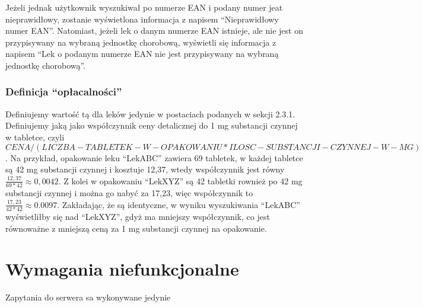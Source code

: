 \documentclass{article}
\begin{document}
      Jeżeli jednak użytkownik wyszukiwał po numerze EAN i podany numer jeat nieprawidłowy, zostanie wyświetlona informacja z napisem  ``Nieprawidłowy numer EAN''.
      Natomiast, jeżeli lek o danym numerze EAN istnieje, ale nie jest on przypisywany na wybraną jednostkę chorobową,
      wyświetli się informacja z napisem  ``Lek o podanym numerze EAN nie jest przypisywany na wybraną jednostkę chorobową''.

      \subsubsection{Definicja ``opłacalności''}
      Definiujemy wartość tą dla leków jedynie w postaciach podanych w sekcji 2.3.1.
      Definiujemy jaką jako współczynnik ceny detalicznej do 1 mg substancji czynnej w tabletce,
      czyli $CENA / (LICZBA-TABLETEK-W-OPAKOWANIU * ILOSC-SUBSTANCJI-CZYNNEJ-W-MG)$.
      Na przykład, opakowanie leku ``LekABC'' zawiera 69 tabletek, w każdej tabletce są 42 mg substancji czynnej i kosztuje 12,37,
      wtedy współczynnik jest równy $\frac{12,37}{69 * 42} \approx 0,0042$.
      Z kolei w opakowaniu ``LekXYZ'' są 42 tabletki rownież po 42 mg substancji czynnej i można go nabyć za 17,23,
      więc współczynnik to $\frac{17,23}{42 * 42} \approx 0.0097$.
      Zakładając, że są identyczne, w wyniku wyszukiwania ``LekABC'' wyświetliłby się nad ``LekXYZ'', gdyż ma mniejszy współczynnik,
      co jest równoważne z mniejszą ceną za 1 mg substancji czynnej na opakowanie.

  \section{Wymagania niefunkcjonalne}
  Zapytania do serwera sa wykonywane jedynie
\end{document}
